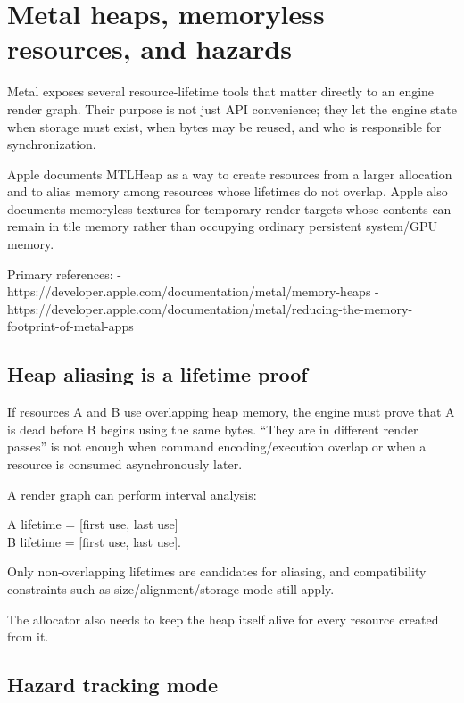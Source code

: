 \hypertarget{appendix-563b2cb23fc3}{}\label{referencestart:appendix-563b2cb23fc3}
\section{Metal heaps, memoryless resources, and hazards}\label{appendix-563b2cb23fc3-metal-heaps-memoryless-resources-and-hazards}

Metal exposes several resource-lifetime tools that matter directly to an engine render graph. Their purpose is not just API convenience; they let the engine state when storage must exist, when bytes may be reused, and who is responsible for synchronization.

Apple documents MTLHeap as a way to create resources from a larger allocation and to alias memory among resources whose lifetimes do not overlap. Apple also documents memoryless textures for temporary render targets whose contents can remain in tile memory rather than occupying ordinary persistent system/GPU memory.

Primary references: - https://developer.apple.com/documentation/metal/memory-heaps - https://developer.apple.com/documentation/metal/reducing-the-memory-footprint-of-metal-apps

\subsection{Heap aliasing is a lifetime proof}\label{appendix-563b2cb23fc3-heap-aliasing-is-a-lifetime-proof}

If resources A and B use overlapping heap memory, the engine must prove that A is dead before B begins using the same bytes. ``They are in different render passes'' is not enough when command encoding/execution overlap or when a resource is consumed asynchronously later.

A render graph can perform interval analysis:

A lifetime = {[}first use, last use{]}\\
B lifetime = {[}first use, last use{]}.

Only non-overlapping lifetimes are candidates for aliasing, and compatibility constraints such as size/alignment/storage mode still apply.

The allocator also needs to keep the heap itself alive for every resource created from it.

\subsection{Hazard tracking mode}\label{appendix-563b2cb23fc3-hazard-tracking-mode}

